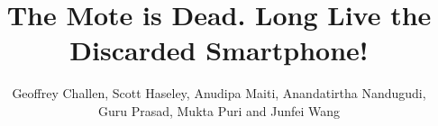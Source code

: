 

\title{The Mote is Dead. Long Live the Discarded Smartphone!}


\author{
\alignauthor
Geoffrey Challen, Scott Haseley, Anudipa Maiti, Anandatirtha Nandugudi,\\
Guru Prasad, Mukta Puri and Junfei Wang\\
\\
\\
}

\crdata{}

\maketitle











{\footnotesize
\renewcommand{\baselinestretch}{0.9}


}


